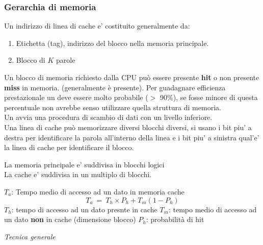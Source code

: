 \documentclass[12pt, a4paper]{article}
\begin{document}
\subsubsection{Gerarchia di memoria}
Un indirizzo di linea di cache e' costituito generalmente da:
\begin{enumerate}
	\item Etichetta (tag), indirizzo del blocco nella memoria principale.
	\item Blocco di $K$ parole
\end{enumerate}

Un blocco di memoria richiesto dalla CPU può essere presente \textbf{hit} o non presente \textbf{miss} in memoria. (generalmente è presente). \newline
Per guadagnare efficienza prestazionale un  deve essere molto probabile ($>$ 90\%), 
se fosse minore di questa percentuale non avrebbe senso utilizzare quella struttura di memoria.\\
Un  avvia una procedura di scambio di dati con un livello inferiore.\\ 
Una linea di cache può memorizzare diversi blocchi diversi, si usano i bit piu' a destra
per identificare la parola all'interno della linea e i bit piu' a sinistra qual'e' 
la linea di cache per identificare il blocco.

\begin{defn}[Organizzazione]
La memoria principale e' suddivisa in blocchi logici\\
La cache e' suddivisa in un multiplo di blocchi.
\end{defn}

\begin{defn}
$T_a$: Tempo medio di accesso ad un dato in memoria cache 
\begin{equation} T_a\ =\ T_h \times P_h + T_m(1-P_h) \end{equation}
$T_h$: tempo di accesso ad un dato presnte in cache
$T_m$: tempo medio di accesso ad un dato \textbf{non} in cache (dimensione blocco)
$P_h$: probabilità di hit \newline
\end{defn}
\textit{Tecnica generale} \newline
\end{document}
